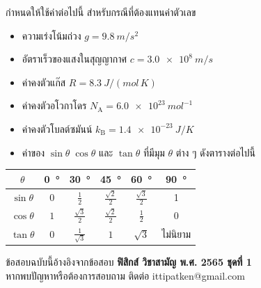 \documentclass[a4paper, 12pt]{article}
\begin{document}
\renewcommand{\thefootnote}{\fnsymbol{footnote}}
\renewcommand{\labelenumii}{\theenumii}
\renewcommand{\theenumii}{\arabic{enumii}.}
\renewcommand{\arraystretch}{1.5}
กำหนดให้ใช้ค่าต่อไปนี้ สำหรับกรณีที่ต้องแทนค่าตัวเลข
\begin{itemize}
    \item[] ความเร่งโน้มถ่วง \(g=\SI{9.8}{m/s^2}\)
    \item[] อัตราเร็วของแสงในสุญญากาศ \(c=\SI{3.0e8}{m/s}\)
    \item[] ค่าคงตัวแก๊ส \(R=\SI{8.3}{J/(mol\,K)}\)
    \item[] ค่าคงตัวอโวกาโดร \(N_\text{A}=\SI{6.0e23}{mol^{-1}}\)
    \item[] ค่าคงตัวโบลต์ซมันน์ \(k_\text{B}=\SI{1.4e-23}{J/K}\)
    \item[] ค่าของ \(\sin\theta\;\cos\theta\) และ \(\tan\theta\) ที่มีมุม \(\theta\) ต่าง ๆ ดังตารางต่อไปนี้
\end{itemize}
\begin{table}[H]
    \centering
    \begin{tabular}{|c|c|c|c|c|c|}
        \hline
        \(\theta\)     & \SI{0}{\degree} & \SI{30}{\degree}       & \SI{45}{\degree}       & \SI{60}{\degree}       & \SI{90}{\degree} \\
        \hline
        \(\sin\theta\) & \(0\)           & \(\frac{1}{2}\)        & \(\frac{\sqrt{2}}{2}\) & \(\frac{\sqrt{3}}{2}\) & 1                \\
        \hline
        \(\cos\theta\) & \(1\)           & \(\frac{\sqrt{3}}{2}\) & \(\frac{\sqrt{2}}{2}\) & \(\frac{1}{2}\)        & \(0\)            \\
        \hline
        \(\tan\theta\) & \(0\)           & \(\frac{1}{\sqrt{3}}\) & \(1\)                  & \(\sqrt{3}\)           & ไม่นิยาม           \\
        \hline
    \end{tabular}
\end{table}
\begin{tcolorbox}[
        box align=center,
        halign=flush center,
        valign=center
    ]
    ข้อสอบฉบับนี้อ้างอิงจากข้อสอบ \textbf{ฟิสิกส์ วิชาสามัญ พ.ศ. 2565 ชุดที่ 1} \\
    หากพบปัญหาหรือต้องการสอบถาม ติดต่อ ittipatken@gmail.com
\end{tcolorbox}
\newpage
\end{document}
